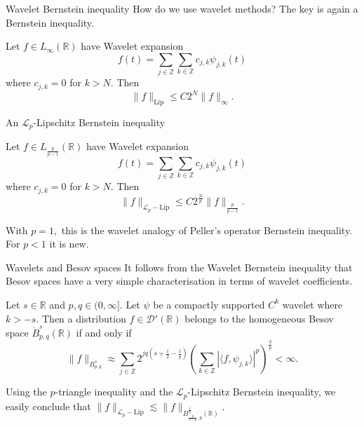 \documentclass{beamer}
\numberwithin{equation}{section}
\theoremstyle{plain}
\theoremstyle{plain}
\theoremstyle{definition}
\theoremstyle{plain}
\theoremstyle{plain}
\theoremstyle{definition}
\newcommand{\Rl}{\mathbb{R}}
\newcommand{\Itgr}{\mathbb{Z}}
\newcommand{\Dc}{\mathcal{D}}
\newcommand{\Lc}{\mathcal{L}}
\begin{document}
\begin{frame}{Wavelet Bernstein inequality}
    How do we use wavelet methods? The key is again a Bernstein inequality.
    \begin{theorem}[Meyer(?) (1980s)]
        Let $f\in L_{\infty}(\Rl)$ have Wavelet expansion
        \[
            f(t) = \sum_{j\in \Itgr} \sum_{k\in \Itgr} c_{j,k}\psi_{j,k}(t)
        \]
        where $c_{j,k}=0$ for $k>N.$ Then
        \[
            \|f\|_{\mathrm{Lip}} \leq C2^N \|f\|_{\infty}.
        \]
    \end{theorem}
\end{frame}

\begin{frame}{An $\Lc_p$-Lipschitz Bernstein inequality}
        \begin{theorem}[M.-Sukochev (2022)]
        Let $f\in L_{\frac{p}{p-1}}(\Rl)$ have Wavelet expansion
        \[
            f(t) = \sum_{j\in \Itgr} \sum_{k\in \Itgr} c_{j,k}\psi_{j,k}(t)
        \]
        where $c_{j,k}=0$ for $k>N.$ Then
        \[
            \|f\|_{\Lc_p-\mathrm{Lip}} \leq C2^{\frac{N}{p}} \|f\|_{\frac{p}{p-1}}.
        \]
    \end{theorem}
    With $p=1,$ this is the wavelet analogy of Peller's operator Bernstein inequality. For $p<1$ it is new.
\end{frame}

\begin{frame}{Wavelets and Besov spaces}
    It follows from the Wavelet Bernstein inequality that Besov spaces have a very simple characterisation in terms of wavelet coefficients.
    \begin{theorem}[Meyer (1986)]
        Let $s \in \Rl$ and $p,q\in (0,\infty].$ Let $\psi$ be a compactly supported $C^k$ wavelet where $k > -s.$ Then a distribution $f\in \Dc'(\Rl)$
        belongs to the homogeneous Besov space $\dot{B}^{s}_{p,q}(\Rl)$ if and only if
        \begin{equation*}
            \|f\|_{B^s_{p,q}}\approx \sum_{j\in \Itgr} 2^{jq(s+\frac{1}{2}-\frac{1}{p})}\left(\sum_{k\in \Itgr} |\langle f,\psi_{j,k}\rangle|^p\right)^{\frac{q}{p}} < \infty.
        \end{equation*}
    \end{theorem}
    Using the $p$-triangle inequality and the $\Lc_p$-Lipschitz Bernstein inequality, we easily conclude that $\|f\|_{\Lc_p-\mathrm{Lip}} \lesssim \|f\|_{B^{\frac1p}_{\frac{p}{1-p},p}(\Rl)}.$
\end{frame}


\begin{frame}
\end{frame}
\end{document}
